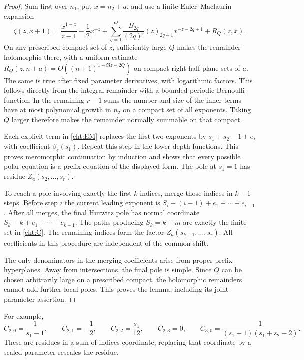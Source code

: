\begin{proof}
Sum first over $n_1$, put $x=n_2+a$, and use a finite
Euler--Maclaurin expansion
\begin{equation}\label{eht:EM}
 \zeta(z,x+1)=\frac{x^{1-z}}{z-1}-\frac12x^{-z}
    +\sum_{q=1}^Q\frac{B_{2q}}{(2q)!}(z)_{2q-1}x^{-z-2q+1}
    +R_Q(z,x).
\end{equation}
On any prescribed compact set of $z$, sufficiently large $Q$ makes the
remainder holomorphic there, with a uniform estimate
$R_Q(z,n+a)=O((n+1)^{1-\Re z-2Q})$ on compact right-half-plane sets of
$a$.  The same is true after fixed parameter derivatives, with logarithmic
factors.  This follows directly from the integral remainder with a bounded
periodic Bernoulli function.  In the remaining $r-1$ sums the number and
size of the inner terms have at most polynomial growth in $n_2$ on a
compact set of all exponents.  Taking $Q$ larger therefore makes the
remainder normally summable on that compact.

Each explicit term in \eqref{eht:EM} replaces the first two exponents by
$s_1+s_2-1+e$, with coefficient $\beta_e(s_1)$.  Repeat this step in the
lower-depth functions.  This proves meromorphic continuation by induction
and shows that every possible polar equation is a prefix equation of the
displayed form.  The pole at $s_1=1$ has residue
$Z_a(s_2,\ldots,s_r)$.

To reach a pole involving exactly the first $k$ indices, merge those
indices in $k-1$ steps.  Before step $i$ the current leading exponent is
$S_i-(i-1)+e_1+\cdots+e_{i-1}$.  After all merges, the final Hurwitz pole
has normal coordinate
$S_k-k+e_1+\cdots+e_{k-1}$.  The paths producing $S_k=k-m$ are exactly
the finite set in \eqref{eht:C}.  The remaining indices form the factor
$Z_a(s_{k+1},\ldots,s_r)$.  All coefficients in this procedure are
independent of the common shift.

The only denominators in the merging coefficients arise from proper
prefix hyperplanes.  Away from intersections, the final pole is simple.
Since $Q$ can be chosen arbitrarily large on a prescribed compact, the
holomorphic remainders cannot add further local poles.  This proves the
lemma, including its joint parameter assertion.
\end{proof}

For example,
\[
 C_{2,0}=\frac1{s_1-1},\qquad C_{2,1}=-\frac12,
 \qquad C_{2,2}=\frac{s_1}{12},\qquad C_{2,3}=0,
 \qquad C_{3,0}=\frac1{(s_1-1)(s_1+s_2-2)}.
\]
These are residues in a sum-of-indices coordinate; replacing that
coordinate by a scaled parameter rescales the residue.

